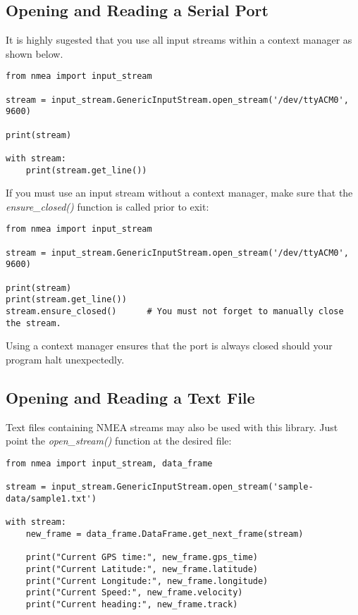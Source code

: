 
\subsection{Opening and Reading a Serial Port}

It is highly sugested that you use all input streams within a context manager as shown below.

\begin{verbatim}
from nmea import input_stream

stream = input_stream.GenericInputStream.open_stream('/dev/ttyACM0', 9600)

print(stream)

with stream:
    print(stream.get_line())
\end{verbatim}

If you must use an input stream without a context manager, make sure that the \emph{ensure\_closed()} function
is called prior to exit:

\begin{verbatim}
from nmea import input_stream

stream = input_stream.GenericInputStream.open_stream('/dev/ttyACM0', 9600)

print(stream)
print(stream.get_line())
stream.ensure_closed()      # You must not forget to manually close the stream.
\end{verbatim}

Using a context manager ensures that the port is always closed should your program halt unexpectedly.

\subsection{Opening and Reading a Text File}

Text files containing NMEA streams may also be used with this library. Just point the \emph{open\_stream()} function at
the desired file:

\begin{verbatim}
from nmea import input_stream, data_frame

stream = input_stream.GenericInputStream.open_stream('sample-data/sample1.txt')

with stream:
    new_frame = data_frame.DataFrame.get_next_frame(stream)

    print("Current GPS time:", new_frame.gps_time)
    print("Current Latitude:", new_frame.latitude)
    print("Current Longitude:", new_frame.longitude)
    print("Current Speed:", new_frame.velocity)
    print("Current heading:", new_frame.track)
\end{verbatim}

